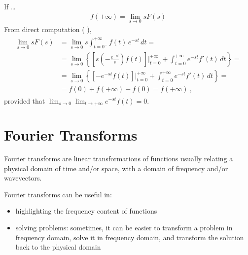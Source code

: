 \documentclass[letterpaper,10pt,english]{jupyterBook}
\begin{document}
\sphinxAtStartPar
{} If …
\begin{equation*}
\begin{split}f(+\infty) = \lim_{s \rightarrow 0} s F(s)\end{split}
\end{equation*}
\sphinxAtStartPar
From direct computation ( ),
\begin{equation*}
\begin{split}\begin{aligned}
 \lim_{s \rightarrow 0} s F(s)
 & = \lim_{s \rightarrow 0} s \int_{t = 0^-}^{+\infty} f(t) \, e^{-st} \, dt = \\
 & = \lim_{s \rightarrow 0} \left\{ \left[s \left(-\frac{e^{-st}}{s}\right)f(t) \right]\bigg|_{t=0}^{+\infty} + \int_{t=0}^{+\infty} e^{-st} f'(t) \, dt \right\} = \\
 & = \lim_{s \rightarrow 0} \left\{ \left[-e^{-st} f(t) \right]\bigg|_{t=0}^{+\infty} + \int_{t=0}^{+\infty} e^{-st} f'(t) \, dt \right\} = \\
 & = f(0) + f(+\infty) - f(0) = f(+\infty) \ ,
\end{aligned}\end{split}
\end{equation*}
\sphinxAtStartPar
provided that \(\lim_{s \rightarrow 0} \lim_{t \rightarrow +\infty} e^{-s t} f(t) = 0\).

\sphinxstepscope


\chapter{Fourier Transforms}
\label{\detokenize{ch/complex/fourier:fourier-transforms}}\label{\detokenize{ch/complex/fourier:complex-fourier}}\label{\detokenize{ch/complex/fourier::doc}}
\sphinxAtStartPar
Fourier transforms are linear transformations of functions usually relating a physical domain of time and/or space, with a domain of frequency and/or wave\sphinxhyphen{}vectors.

\sphinxAtStartPar
Fourier transforms can be useful in:
\begin{itemize}
\item {} 
\sphinxAtStartPar
highlighting the frequency content of functions

\item {} 
\sphinxAtStartPar
solving problems: sometimes, it can be easier to transform a problem in frequency domain, solve it in frequency domain, and transform the solution back to the physical domain

\end{itemize}
\end{document}
